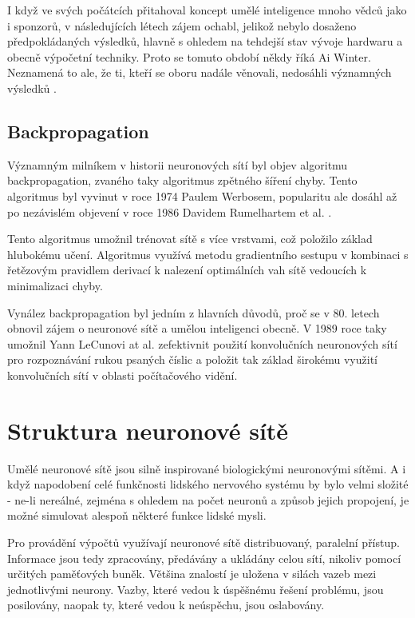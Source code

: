 I když ve svých počátcích přitahoval koncept umělé inteligence mnoho vědců jako
i sponzorů, v následujících létech zájem ochabl, jelikož nebylo dosaženo
předpokládaných výsledků, hlavně s ohledem na tehdejší stav vývoje hardwaru a
obecně výpočetní techniky. Proto se tomuto období někdy říká Ai Winter.
Neznamená to ale, že ti, kteří se oboru nadále věnovali, nedosáhli významných
výsledků \cite{nn_history}.

\subsection{Backpropagation}
Významným milníkem v historii neuronových sítí byl objev algoritmu
backpropagation, zvaného taky algoritmus zpětného šíření chyby. Tento
algoritmus byl vyvinut v roce 1974 Paulem Werbosem, popularitu ale dosáhl až po
nezávislém objevení v roce 1986 Davidem Rumelhartem et al.
\cite{backpropagation}.

Tento algoritmus umožnil trénovat sítě s více vrstvami, což položilo základ
hlubokému učení. Algoritmus využívá metodu gradientního sestupu v kombinaci s
řetězovým pravidlem derivací k nalezení optimálních vah sítě vedoucích k
minimalizaci chyby.

Vynález backpropagation byl jedním z hlavních důvodů, proč se v 80. letech
obnovil zájem o neuronové sítě a umělou inteligenci obecně. V 1989 roce taky
umožnil Yann LeCunovi at al. zefektivnit použití konvolučních neuronových sítí
pro rozpoznávání rukou psaných číslic \cite{lecun1989} a položit tak základ
širokému využití konvolučních sítí v oblasti počítačového vidění.

\section{Struktura neuronové sítě}

Umělé neuronové sítě jsou silně inspirované biologickými neuronovými sítěmi. A
i když napodobení celé funkčnosti lidského nervového systému by bylo velmi
složité - ne-li nereálné, zejména s ohledem na počet neuronů a způsob jejich
propojení, je možné simulovat alespoň některé funkce lidské mysli.

Pro provádění výpočtů využívají neuronové sítě distribuovaný, paralelní
přístup. Informace jsou tedy zpracovány, předávány a ukládány celou sítí,
nikoliv pomocí určitých paměťových buněk. Většina znalostí je uložena v silách
vazeb mezi jednotlivými neurony. Vazby, které vedou k úspěšnému řešení
problému, jsou posilovány, naopak ty, které vedou k neúspěchu, jsou oslabovány.

